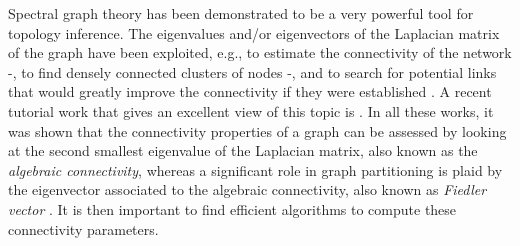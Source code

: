 \documentclass[10pt,twocolumn]{IEEEtran}
\begin{document}
Spectral graph theory \cite{Chung} has been demonstrated to be a very powerful tool for topology inference. The eigenvalues and/or eigenvectors of the Laplacian matrix of the graph have been exploited, e.g., to estimate the connectivity of the network \cite{Fiedler}-\cite{Aragues-Shi-Dimarogonas-Sagues-Johansson}, to find densely connected clusters of nodes \cite{Bojan}-\cite{Hagen-Kaghn}, and to search for potential links that would greatly improve the connectivity if they were established \cite{Gosh-Boyd}. A recent tutorial work that gives an excellent view of this topic is \cite{Bertrand-Moonen2}. In all these works, it was shown that the connectivity properties of a graph can be assessed by looking at the second smallest eigenvalue of the Laplacian matrix, also known as the \textit{algebraic connectivity}, whereas a significant role in graph partitioning is plaid by the eigenvector associated to the algebraic connectivity, also known as \textit{Fiedler vector} \cite{Fiedler}. It is then important to find efficient algorithms to compute these connectivity parameters.
\end{document}
